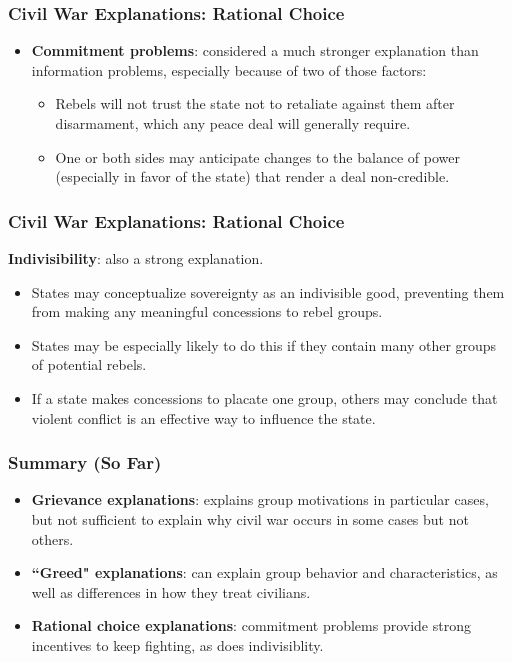 \documentclass{beamer}
\begin{document}
\begin{frame} 
	\frametitle{\LARGE{Civil War Explanations: Rational Choice}}
	\begin{itemize}
		\item \textbf{Commitment problems}: considered a much stronger explanation than information problems, especially because of two of those factors:
		\begin{itemize}
			\item Rebels will not trust the state not to retaliate against them after disarmament, which any peace deal will generally require. \pause
			\item One or both sides may anticipate changes to the balance of power (especially in favor of the state) that render a deal non-credible.
		\end{itemize}
	\end{itemize}
\end{frame}


\begin{frame} 
	\frametitle{\LARGE{Civil War Explanations: Rational Choice}}
 \textbf{Indivisibility}: also a strong explanation.
		\begin{itemize}
			\item States may conceptualize sovereignty as an indivisible good, preventing them from making any meaningful concessions to rebel groups. \pause
			\item States may be especially likely to do this if they contain many other groups of potential rebels. \pause
			\item If a state makes concessions to placate one group, others may conclude that violent conflict is an effective way to influence the state.
		\end{itemize}
\end{frame}

\begin{frame} 
	\frametitle{\LARGE{Summary (So Far)}}
	\begin{itemize}
		\item \textbf{Grievance explanations}: explains group motivations in particular cases, but not sufficient to explain why civil war occurs in some cases but not others. \pause
		\item \textbf{``Greed" explanations}: can explain group behavior and characteristics, as well as differences in how they treat civilians. \pause
		\item \textbf{Rational choice explanations}: commitment problems provide strong incentives to keep fighting, as does indivisiblity.
	\end{itemize}
\end{frame}
\end{document}

